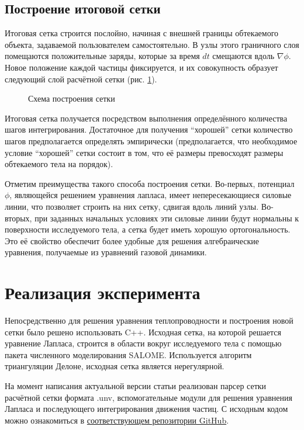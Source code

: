 \documentclass[a4paper,12pt]{article}
\begin{document}
\subsection{Построение итоговой сетки}

Итоговая сетка строится послойно, начиная с внешней границы обтекаемого объекта, задаваемой пользователем самостоятельно. В узлы этого граничного слоя помещаются положительные заряды, которые за время $dt$ смещаются вдоль $\nabla \phi$. Новое положение каждой частицы фиксируется, и их совокупность образует следующий слой расчётной сетки (рис. \ref{fig:схема построения сетки}).

\begin{figure}[htbp]
    \centering
    
    \caption{Схема построения сетки}
    \label{fig:схема построения сетки}
\end{figure}

Итоговая сетка получается посредством выполнения определённого количества шагов интегрирования. Достаточное для получения “хорошей” сетки количество шагов предполагается определять эмпирически (предполагается, что необходимое условие “хорошей” сетки состоит в том, что её размеры превосходят размеры обтекаемого тела на порядок).

Отметим преимущества такого способа построения сетки. Во-первых, потенциал $\phi$, являющейся решением уравнения лапласа, имеет непересекающиеся силовые линии, что позволяет строить на них сетку, сдвигая вдоль линий узлы. Во-вторых, при заданных начальных условиях эти силовые линии будут нормальны к поверхности исследуемого тела, а сетка будет иметь хорошую ортогональность. Это её свойство обеспечит более удобные для решения алгебраические уравнения, получаемые из уравнений газовой динамики.

\section{Реализация эксперимента}

Непосредственно для решения уравнения теплопроводности и построения новой сетки было решено использовать C++. Исходная сетка, на которой решается уравнение Лапласа, строится в области вокруг исследуемого тела с помощью пакета численного моделирования SALOME. Используется алгоритм триангуляции Делоне, исходная сетка является нерегулярной.

На момент написания актуальной версии статьи реализован парсер сетки расчётной сетки формата .unv, вспомогательные модули для решения уравнения Лапласа и последующего интегрирования движения частиц. С исходным кодом можно ознакомиться в \href{https://github.com/d-qql/FlowMeshBuilder}{соответствующем репозитории  GitHub}.
\end{document}
